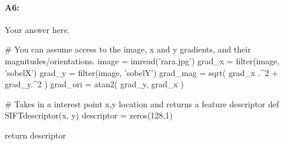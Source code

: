 \paragraph{A6:} Your answer here.


\begin{python}
# You can assume access to the image, x and y gradients, and their magnitudes/orientations.
image = imread('rara.jpg')
grad_x = filter(image, 'sobelX')
grad_y = filter(image, 'sobelY')
grad_mag = sqrt( grad_x .^2 + grad_y.^2 )
grad_ori = atan2( grad_y, grad_x )

# Takes in a interest point x,y location and returns a feature descriptor
def SIFTdescriptor(x, y)
    descriptor = zeros(128,1)

    return descriptor
\end{python}




%
%














